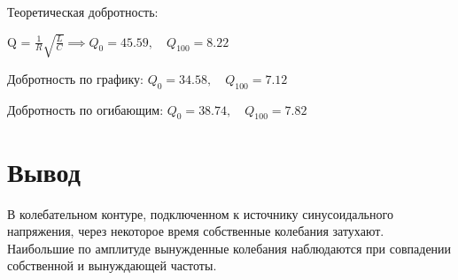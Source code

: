 \documentclass[a4paper,12pt]{article}
\begin{document}
	Теоретическая добротность:
	
	Q = $\frac{1}{R}\sqrt{\frac{L}{C}} \implies Q_0 = 45.59, \quad Q_{100} = 8.22$
	
	Добротность по графику:
	$Q_0 = 34.58, \quad Q_{100} = 7.12$
	
	Добротность по огибающим:
	$Q_0 = 38.74, \quad Q_{100} = 7.82$
	
	\section{Вывод}
		В колебательном контуре, подключенном к источнику синусоидального напряжения, через некоторое время собственные колебания затухают. Наибольшие по амплитуде вынужденные колебания наблюдаются при совпадении собственной и вынуждающей частоты.
		
\end{document}
